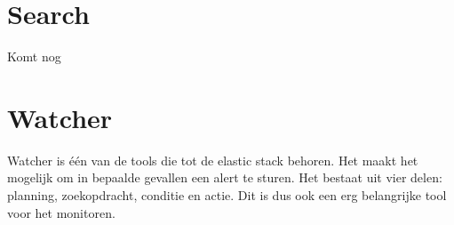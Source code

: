 \section{Search}
\label{sec:search}

Komt nog

\section{Watcher}
\label{sec:watcher}

Watcher is één van de tools die tot de elastic stack behoren. Het maakt het mogelijk om in bepaalde gevallen een alert te sturen.
Het bestaat uit vier delen: planning, zoekopdracht, conditie en actie. Dit is dus ook een erg belangrijke tool voor het monitoren.

